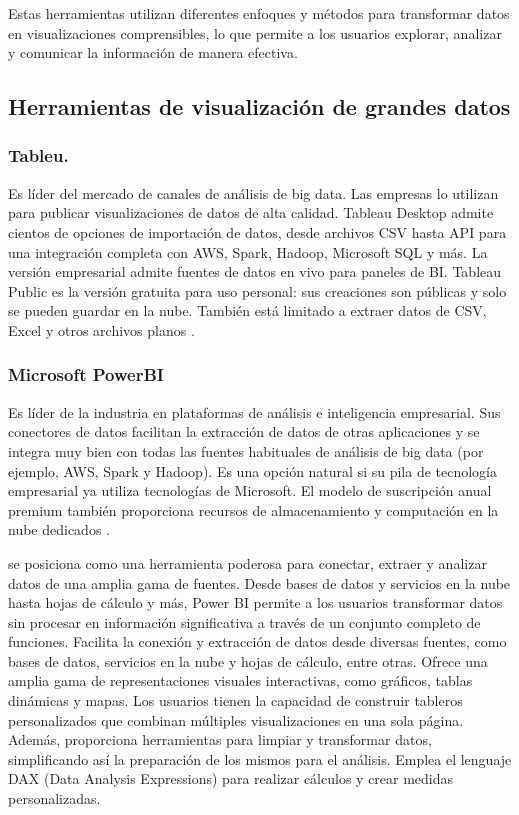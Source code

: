 \documentclass[
  11pt,
  bookmarksnumbered]{article}
\begin{document}
Estas herramientas utilizan diferentes enfoques y métodos para transformar datos en visualizaciones comprensibles, lo que permite a los usuarios explorar, analizar y comunicar la información de manera efectiva.

\hypertarget{herramientas-de-visualizaciuxf3n-de-grandes-datos}{%
\subsection{Herramientas de visualización de grandes datos}\label{herramientas-de-visualizaciuxf3n-de-grandes-datos}}

\hypertarget{tableu.}{%
\subsubsection{Tableu.}\label{tableu.}}

Es líder del mercado de canales de análisis de big data.
Las empresas lo utilizan para publicar visualizaciones de datos de alta calidad.
Tableau Desktop admite cientos de opciones de importación de datos, desde archivos CSV hasta API para una integración completa con AWS, Spark, Hadoop, Microsoft SQL y más.
La versión empresarial admite fuentes de datos en vivo para paneles de BI.
Tableau Public es la versión gratuita para uso personal: sus creaciones son públicas y solo se pueden guardar en la nube.
También está limitado a extraer datos de CSV, Excel y otros archivos planos \textcite{upwork2023best}.

\hypertarget{microsoft-powerbi}{%
\subsubsection{Microsoft PowerBI}\label{microsoft-powerbi}}

Es líder de la industria en plataformas de análisis e inteligencia empresarial.
Sus conectores de datos facilitan la extracción de datos de otras aplicaciones y se integra muy bien con todas las fuentes habituales de análisis de big data (por ejemplo, AWS, Spark y Hadoop).
Es una opción natural si su pila de tecnología empresarial ya utiliza tecnologías de Microsoft.
El modelo de suscripción anual premium también proporciona recursos de almacenamiento y computación en la nube dedicados \textcite{upwork2023best}.

se posiciona como una herramienta poderosa para conectar, extraer y analizar datos de una amplia gama de fuentes.
Desde bases de datos y servicios en la nube hasta hojas de cálculo y más, Power BI permite a los usuarios transformar datos sin procesar en información significativa a través de un conjunto completo de funciones.
Facilita la conexión y extracción de datos desde diversas fuentes, como bases de datos, servicios en la nube y hojas de cálculo, entre otras.
Ofrece una amplia gama de representaciones visuales interactivas, como gráficos, tablas dinámicas y mapas.
Los usuarios tienen la capacidad de construir tableros personalizados que combinan múltiples visualizaciones en una sola página.
Además, proporciona herramientas para limpiar y transformar datos, simplificando así la preparación de los mismos para el análisis.
Emplea el lenguaje DAX (Data Analysis Expressions) para realizar cálculos y crear medidas personalizadas.
\end{document}
